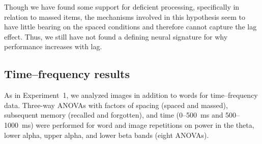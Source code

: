 Though we have found some support for deficient processing, specifically in relation to massed items, the mechanisms involved in this hypothesis seem to have little bearing on the spaced conditions and therefore cannot capture the lag effect.  Thus, we still have not found a defining neural signature for why performance increases with lag.

\subsection{Time--frequency results}

As in Experiment~1, we analyzed images in addition to words for time--frequency data.
Three-way ANOVAs with factors of spacing (spaced and massed), subsequent memory (recalled and forgotten), and time (0--500~ms and 500--1000~ms) were performed for word and image repetitions on power in the theta, lower alpha, upper alpha, and lower beta bands (eight ANOVAs).


